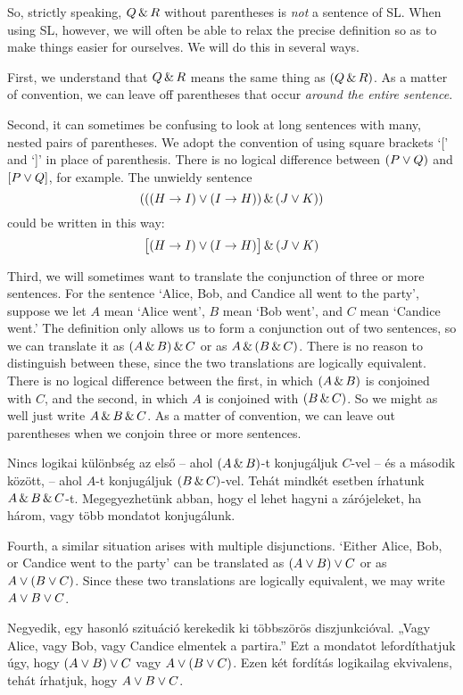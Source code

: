 So, strictly speaking, $Q \,\&\, R$ without parentheses is \emph{not} a sentence of SL. When using SL, however, we will often be able to relax the precise definition so as to make things easier for ourselves. We will do this in several ways.

First,  we understand that $Q \,\&\, R$ means the same thing as $(Q \,\&\, R)$. As a matter of convention, we can leave off parentheses that occur \emph{around the entire sentence}.

Second, it can sometimes be confusing to look at long sentences with many, nested pairs of parentheses. We adopt the convention of using square brackets `[' and `]' in place of parenthesis. There is no logical difference between $(P\vee Q)$ and $[P\vee Q]$, for example. The unwieldy sentence
$$(((H \rightarrow I) \vee (I \rightarrow H)) \,\&\, (J \vee K))$$
could be written in this way:
$$\bigl[(H \rightarrow I) \vee (I \rightarrow H)\bigr] \,\&\, (J \vee K)$$


Third, we will sometimes want to translate the conjunction of three or more sentences. For the sentence `Alice, Bob, and Candice all went to the party', suppose we let $A$ mean `Alice went', $B$ mean `Bob went', and $C$ mean `Candice went.' The definition only allows us to form a conjunction out of two sentences, so we can translate it as $(A \,\&\, B) \,\&\, C$ or as $A \,\&\, (B \,\&\, C)$. There is no reason to distinguish between these, since the two translations are logically equivalent. There is no logical difference between the first, in which $(A \,\&\, B)$ is conjoined with $C$, and the second, in which $A$ is conjoined with $(B \,\&\, C)$.  So we might as well just write $A \,\&\, B \,\&\, C$. As a matter of convention, we can leave out parentheses when we conjoin three or more sentences.

Nincs logikai különbség az első -- ahol $(A \,\&\, B)$-t konjugáljuk $C$-vel -- és a második között, -- ahol $A$-t konjugáljuk $(B \,\&\, C)$-vel. Tehát mindkét esetben írhatunk $A \,\&\, B \,\&\, C$-t. Megegyezhetünk abban, hogy el lehet hagyni a zárójeleket, ha három, vagy több mondatot konjugálunk.

Fourth, a similar situation arises with multiple disjunctions. `Either Alice, Bob, or Candice went to the party' can be translated as $(A \vee B) \vee C$ or as $A \vee (B \vee C)$. Since these two translations are logically equivalent, we may write $A \vee B \vee C$.

Negyedik, egy hasonló szituáció kerekedik ki többszörös diszjunkcióval. „Vagy Alice, vagy Bob, vagy Candice elmentek a partira.” Ezt a mondatot lefordíthatjuk úgy, hogy $(A \vee B) \vee C$ vagy $A \vee (B \vee C)$. Ezen két fordítás logikailag ekvivalens, tehát írhatjuk, hogy $A \vee B \vee C$.


